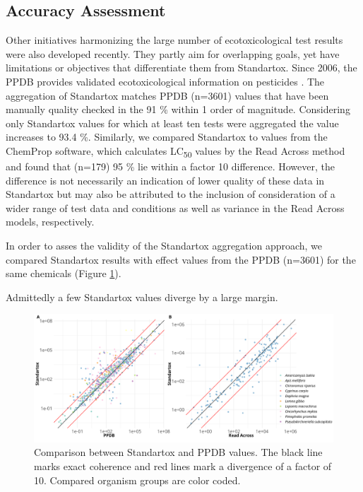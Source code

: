 \subsection{Accuracy Assessment}
Other initiatives harmonizing the large number of ecotoxicological test results were also developed recently. They partly aim for overlapping goals, yet have limitations or objectives that differentiate them from Standartox. Since 2006, the PPDB provides validated ecotoxicological information on pesticides \citep{lewis_international_2016}. The aggregation of Standartox matches PPDB (n=3601) values that have been manually quality checked in the 91 \% within 1 order of magnitude. Considering only Standartox values for which at least ten tests were aggregated the value increases to 93.4 \%. Similarly, we compared Standartox to values from the ChemProp \citep{ufzdepartmentofecologicalchemistry_chemprop_2019} software, which calculates LC\textsubscript{50} values by the Read Across method \citep{schuurmann_quantitative_2011} and found that (n=179) 95 \% lie within a factor 10 difference. However, the difference is not necessarily an indication of lower quality of these data in Standartox but may also be attributed to the inclusion of consideration of a wider range of test data and conditions as well as variance in the Read Across models, respectively.




In order to asses the validity of the Standartox aggregation approach, we compared Standartox results with effect values from the PPDB (n=3601) for the same chemicals (Figure \ref{fig:standartox_ppdb_diff}). 

  Admittedly a few Standartox values diverge by a large margin.

\begin{figure}
    \includegraphics[width=1\linewidth]{article/figures/gg_ppdb_stan_compare_continous.png}
    \caption{Comparison between Standartox and PPDB values. The black line marks exact coherence and red lines mark a divergence of a factor of 10. Compared organism groups are color coded.}
    \label{fig:standartox_ppdb_diff}
\end{figure}

